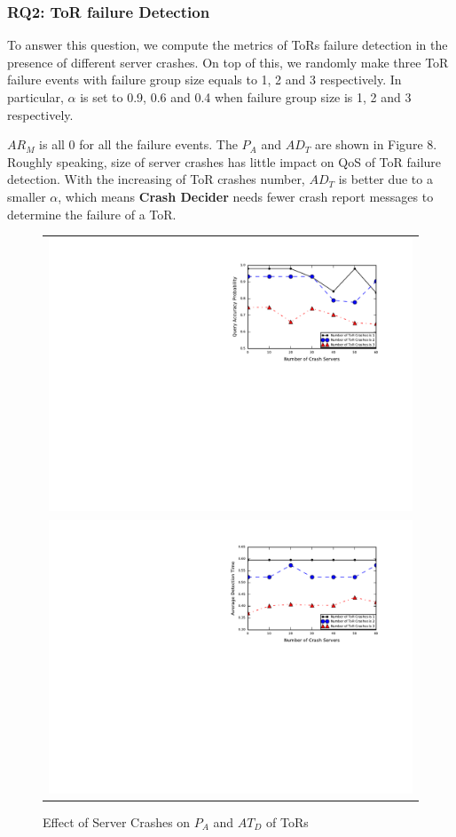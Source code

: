 \documentclass{sig-alternate-05-2015}
\begin{document}
\subsubsection*{RQ2: ToR failure Detection}
\quad To answer this question, we compute the metrics of ToRs failure detection in the presence of different server crashes. On top of this, we randomly make three ToR failure events with failure group size equals to 1, 2 and 3 respectively. In particular, $\alpha$ is set to 0.9, 0.6 and 0.4 when failure group size is 1, 2 and 3 respectively.

$AR_M$ is all 0 for all the failure events. The $P_A$ and $AD_T$ are shown in Figure 8. Roughly speaking, size of server crashes has little impact on QoS of ToR failure detection. With the increasing of ToR crashes number, $AD_T$ is better due to a smaller $\alpha$, which means \textbf{Crash Decider} needs fewer crash report messages to determine the failure of a ToR.

\begin{figure}[t]
  \centering
  \begin{tabular}{c}
  \includegraphics[scale=0.7]{tor-r1} \\
  \includegraphics[scale=0.7]{tor-r2} \\
  \end{tabular}
  \caption{Effect of Server Crashes on $P_A$ and $AT_D$ of ToRs}
\end{figure}
\end{document}
